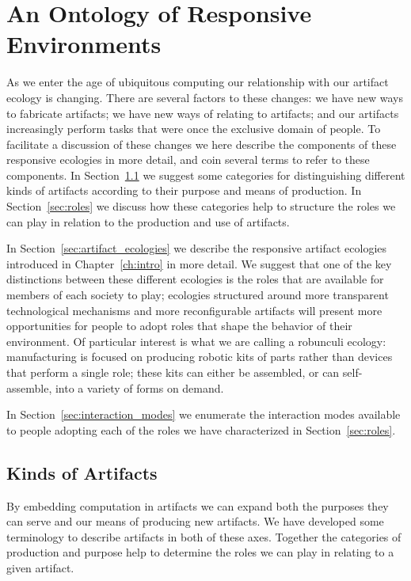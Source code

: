 \chapter{An Ontology of Responsive Environments}
\label{ch:ontology}
%
As we enter the age of ubiquitous computing our relationship with our artifact ecology is changing. 
There are several factors to these changes: we have new ways to fabricate artifacts; we have new ways of relating to artifacts; and our artifacts increasingly perform tasks that were once the exclusive domain of people.
To facilitate a discussion of these changes we here describe the components of these responsive ecologies in more detail, and coin several terms to refer to these components.
In Section~\ref{sec:kinds_of_artifacts} we suggest some categories for distinguishing different kinds of artifacts according to their purpose and means of production.
In Section~\ref{sec:roles} we discuss how these categories help to structure the roles we can play in relation to the production and use of artifacts.

In Section~\ref{sec:artifact_ecologies} we describe the responsive artifact ecologies introduced in Chapter~\ref{ch:intro} in more detail. 
We suggest that one of the key distinctions between these different ecologies is the roles that are available for members of each society to play; ecologies structured around more transparent technological mechanisms and more reconfigurable artifacts will present more opportunities for people to adopt roles that shape the behavior of their environment. 
Of particular interest is what we are calling a robunculi ecology: manufacturing is focused on producing robotic kits of parts rather than devices that perform a single role; these kits can either be assembled, or can self-assemble, into a variety of forms on demand. 

In Section~\ref{sec:interaction_modes} we enumerate the interaction modes available to people adopting each of the roles we have characterized in Section~\ref{sec:roles}. 


\section{Kinds of Artifacts}
\label{sec:kinds_of_artifacts}
%
By embedding computation in artifacts we can expand both the purposes they can serve and our means of producing new artifacts. 
We have developed some terminology to describe artifacts in both of these axes. 
Together the categories of production and purpose help to determine the roles we can play in relating to a given artifact.

